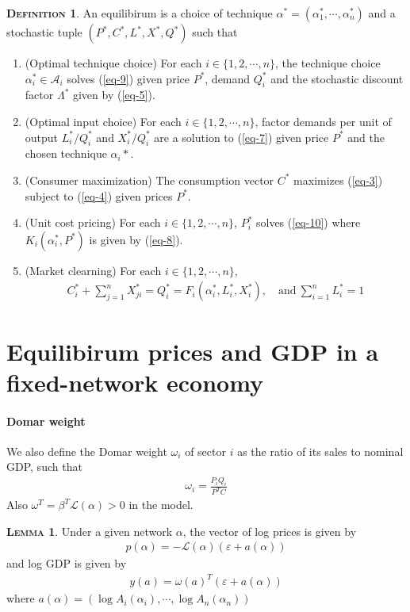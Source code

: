\documentclass[11pt]{article}
\theoremstyle{definition}
\newtheorem{define}{\noindent \textbf{\textsc{Definition}}}
\newtheorem{lemma}{\noindent \textbf{\textsc{Lemma}}}
\begin{document}
	\begin{define}
		An equilibirum is a choice of technique $\alpha^* = (\alpha_1^*,\cdots, \alpha_n^*)$ and a stochastic tuple $(P^*, C^*, L^*, X^*, Q^*)$ such that
		\begin{enumerate}[leftmargin=1cm, label=\arabic*.]
			\item (Optimal technique choice) For each $i\in\{1,2,\cdots,n\}$, the technique choice $\alpha_i^*\in\mathcal{A}_i$ solves (\ref{eq-9}) given price $P^*$, demand $Q^*_i$ and the stochastic discount factor $\Lambda^*$ given by (\ref{eq-5}).
			\item (Optimal input choice) For each $i\in\{1,2,\cdots,n\}$, factor demands per unit of output $L_i^*/Q_i^*$ and $X_i^*/Q_i^*$ are a solution to (\ref{eq-7}) given price $P^*$ and the chosen technique $\alpha_i*$.
			\item (Consumer maximization) The consumption vector $C^*$ maximizes (\ref{eq-3}) subject to (\ref{eq-4}) given prices $P^*$.
			\item (Unit cost pricing) For each $i\in\{1,2,\cdots,n\}$, $P^*_i$ solves (\ref{eq-10}) where $K_i(\alpha_i^*, P^*)$ is given by (\ref{eq-8}).
			\item (Market clearning) For each $i\in\{1,2,\cdots,n\}$,
			\begin{align}
				C_i^* + \sum\limits_{j=1}^n X_{ji}^* = Q_i^* = F_i(\alpha_i^*, L_i^*, X_i^*), \quad \text{and} \ \sum\limits_{i=1}^n L_i^* = 1 \label{eq-11}
			\end{align}
		\end{enumerate}
	\end{define}
	
	
	\section{Equilibirum prices and GDP in a fixed-network economy}
	\paragraph{Domar weight} 
	We also define the Domar weight $\omega_i$ of sector $i$ as the ratio of its sales to nominal GDP, such that
	\begin{align*}
		\omega_i = \frac{P_iQ_i}{P^TC}
	\end{align*}
	Also $\omega^T = \beta^T \mathcal{L}(\alpha) > 0$ in the model.
	
	\begin{lemma}
		Under a given network $\alpha$, the vector of log prices is given by
		\begin{align}
			p(\alpha) = -\mathcal{L}(\alpha)(\varepsilon + a(\alpha)) \label{eq-12}
		\end{align}
		and log GDP is given by
		\begin{align}
			y(a) = \omega (a)^T (\varepsilon + a(\alpha)) \label{eq-13}
		\end{align}
		where $a(\alpha) = (\log A_i(\alpha_i),\cdots, \log A_n(\alpha_n))$
	\end{lemma}
	
\end{document}
